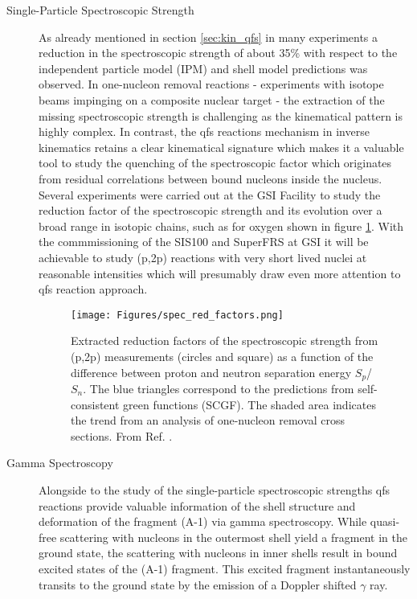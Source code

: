 \begin{description}
\item[Single-Particle Spectroscopic Strength]As already mentioned in section \ref{sec:kin_qfs} in many experiments a reduction in the spectroscopic strength of about 35\% with respect to the independent particle model (IPM) and shell model predictions was observed. In one-nucleon removal reactions - experiments with isotope beams impinging on a composite nuclear target - the extraction of the missing spectroscopic strength is challenging as the kinematical pattern is highly complex. In contrast, the qfs reactions mechanism in inverse kinematics retains a clear kinematical signature which makes it a valuable tool to study the quenching of the spectroscopic factor which originates from residual correlations between bound nucleons inside the nucleus. \newline
Several experiments were carried out at the GSI Facility to study the reduction factor of the spectroscopic strength  and its evolution over a broad range in isotopic chains, such as for oxygen shown in figure \ref{fig:red_factor}. With the commmissioning of the SIS100 and SuperFRS at GSI it will be achievable to study (p,2p) reactions with very short lived nuclei at reasonable intensities which will presumably draw even more attention to qfs reaction approach.  
\begin{figure}[htpb]
    \centering
    \texttt{[image: Figures/spec\_red\_factors.png]}
    \caption{
   	Extracted reduction factors of the spectroscopic strength from (p,2p) measurements (circles and square) as a function of the difference between proton and neutron separation energy $S_p$/$S_n$. The blue triangles correspond to the predictions from self-consistent green functions (SCGF). The shaded area indicates the trend from an analysis of one-nucleon removal cross sections. From Ref. \cite{atar2018quasifree}.   
    }
    \label{fig:red_factor}
\end{figure}
\item[Gamma Spectroscopy]Alongside to the study of the single-particle spectroscopic strengths qfs reactions provide valuable information of the shell structure and deformation of the fragment (A-1) via gamma spectroscopy. While quasi-free scattering with nucleons in the outermost shell yield a fragment in the ground state, the scattering with nucleons in inner shells result in bound excited states of the (A-1) fragment. This excited fragment instantaneously transits to the ground state by the emission of a Doppler shifted $\gamma$ ray.\newline

\end{description}
